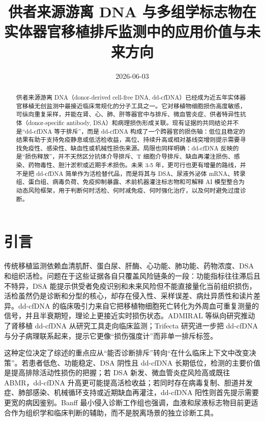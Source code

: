 \documentclass[11pt,a4paper]{article}
\title{供者来源游离 DNA
与多组学标志物在实体器官移植排斥监测中的应用价值与未来方向}
\author{}
\date{2026-06-03}
\begin{document}
\maketitle
\tableofcontents
\newpage

\begin{abstract}
供者来源游离 DNA（donor-derived cell-free DNA,
dd-cfDNA）已经成为近五年实体器官移植无创监测中最接近临床常规化的分子工具之一。它对移植物细胞损伤高度敏感，可纵向重复采样，并能在肾、心、肺、肝等器官中与排斥、微血管炎症、供者特异性抗体（donor-specific antibody,
DSA）和病理损伤形成关联。现有证据的共同结论并不是``dd-cfDNA
等于排斥''，而是 dd-cfDNA
构成了一个跨器官的损伤轴：低位且稳定的结果有助于支持免疫静息或低活检收益，高位、持续升高或相对基线突增则提示需要寻找免疫性、感染性、缺血性或机械性损伤来源。局限也同样明确：dd-cfDNA
反映的是``损伤释放''，并不天然区分抗体介导排斥、T
细胞介导排斥、缺血再灌注损伤、感染、药物毒性、胆汁淤积或近期手术损伤。未来 3-5
年，更可行也更有增量的路线，并不是把 dd-cfDNA
简单作为活检替代品，而是将其与 DSA、尿液外泌体
mRNA、转录组、蛋白组、病毒负荷、免疫抑制暴露、术前机器灌注标志物和可解释 AI
模型整合为动态风险框架，用于判断何时活检、何时减免疫、何时强化治疗，以及何时避免过度诊断。
\end{abstract}

\section{引言}\label{ux5f15ux8a00}

传统移植监测依赖血清肌酐、蛋白尿、肝酶、心功能、肺功能、药物浓度、DSA
和组织活检。问题在于这些证据各自只覆盖风险链条的一段：功能指标往往滞后且不特异，DSA
能提示供受者免疫识别和未来风险但不能直接量化当前组织损伤，活检虽然仍是诊断和分型的核心，却存在侵入性、采样误差、病灶异质性和读片差异。dd-cfDNA
的临床吸引力来自它把移植物细胞死亡转化为外周血可重复测量的信号，并且半衰期短，理论上更接近实时损伤状态。ADMIRAL
等纵向研究推动了肾移植 dd-cfDNA 从研究工具走向临床监测；Trifecta
研究进一步把 dd-cfDNA
与分子病理联系起来，提示它更像``损伤强度计''而非单一排斥标签\cite{clinicaloutcomesfrom2021, thetrifectastudy2022, distinctmolecularprocesses2023}。

这种定位决定了综述的重点应从``能否诊断排斥''转向``在什么临床上下文中改变决策''。若患者低危、功能稳定、DSA
阴性且 dd-cfDNA 长期低位，检测的主要价值是提高排除活动性损伤的把握；若 DSA
新发、微血管炎症风险高或既往 ABMR，dd-cfDNA
升高更可能提高活检收益；若同时存在病毒复制、胆道并发症、肺部感染、机械循环支持或近期缺血再灌注，dd-cfDNA
阳性则首先提示需要更宽的病因鉴别。Banff
最小侵入诊断工作组也强调，血液和尿液标志物目前更适合作为组织学和临床判断的辅助，而不是脱离场景的独立诊断工具\cite{diagnosticpotentialof2022, donorderivedcell20251}。
\end{document}
